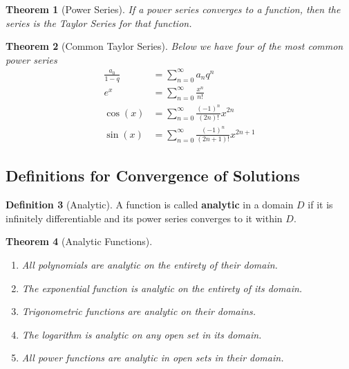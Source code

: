 \documentclass[12pt]{article}
\newtheorem{thm}{Theorem}[section]
\theoremstyle{definition}
\newtheorem{defn}[thm]{Definition}
\theoremstyle{remark}
\numberwithin{equation}{section}
\newcommand\B[1]{\textbf{ #1}}
\begin{document}
\vspace{1cm}

\begin{thm}[Power Series]
        If a power series converges to a function, then the series is the Taylor Series for that function.
\end{thm}


\vspace{1cm}


\begin{thm}[Common Taylor Series]
        Below we have four of the most common power series \begin{align}
                \frac{a_0}{1-q} &= \sum\limits_{n=0}^{\infty}a_nq^n \\
                e^x &= \sum\limits_{n=0}^{\infty}\frac{x^n}{n!} \\
                \cos(x) &= \sum\limits_{n=0}^{\infty}\frac{(-1)^n}{(2n)!}x^{2n} \\
                \sin(x) &= \sum\limits_{n=0}^{\infty}\frac{(-1)^n}{(2n+1)!}x^{2n+1}
        \end{align}
\end{thm}


\vspace{1cm}


\subsection{Definitions for Convergence of Solutions}

\begin{defn}[Analytic]
        A function is called \B{analytic} in a domain $D$ if it is infinitely differentiable and its power series converges to it within $D$.
\end{defn}


\vspace{1cm}


\begin{thm}[Analytic Functions]
        \begin{enumerate}
                \item All polynomials are analytic on the entirety of their domain.
                \item The exponential function is analytic on the entirety of its domain.
                \item Trigonometric functions are analytic on their domains.
                \item The logarithm is analytic on any open set in its domain.
                \item All power functions are analytic in open sets in their domain.
        \end{enumerate}
\end{thm}
\end{document}
